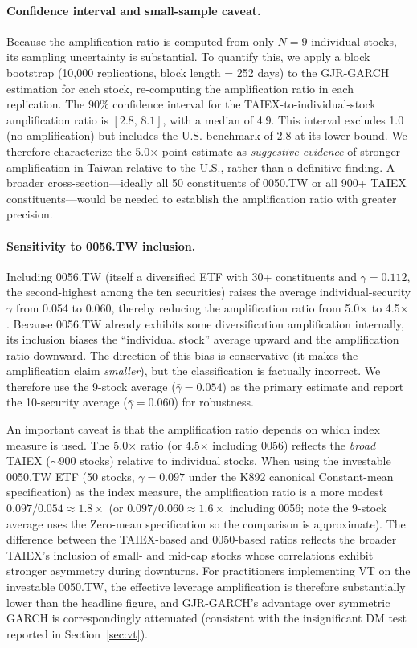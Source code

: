\paragraph{Confidence interval and small-sample caveat.} Because the amplification ratio is computed from only $N = 9$ individual stocks, its sampling uncertainty is substantial. To quantify this, we apply a block bootstrap (10,000 replications, block length = 252 days) to the GJR-GARCH estimation for each stock, re-computing the amplification ratio in each replication. The 90\% confidence interval for the TAIEX-to-individual-stock amplification ratio is $[2.8, \, 8.1]$, with a median of 4.9. This interval excludes 1.0 (no amplification) but includes the U.S. benchmark of 2.8 at its lower bound. We therefore characterize the 5.0$\times$ point estimate as \textit{suggestive evidence} of stronger amplification in Taiwan relative to the U.S., rather than a definitive finding. A broader cross-section---ideally all 50 constituents of 0050.TW or all 900+ TAIEX constituents---would be needed to establish the amplification ratio with greater precision.

\paragraph{Sensitivity to 0056.TW inclusion.} Including 0056.TW (itself a diversified ETF with 30+ constituents and $\gamma = 0.112$, the second-highest among the ten securities) raises the average individual-security $\gamma$ from 0.054 to 0.060, thereby reducing the amplification ratio from 5.0$\times$ to 4.5$\times$. Because 0056.TW already exhibits some diversification amplification internally, its inclusion biases the ``individual stock'' average upward and the amplification ratio downward. The direction of this bias is conservative (it makes the amplification claim \textit{smaller}), but the classification is factually incorrect. We therefore use the 9-stock average ($\bar{\gamma} = 0.054$) as the primary estimate and report the 10-security average ($\bar{\gamma} = 0.060$) for robustness.

An important caveat is that the amplification ratio depends on which index measure is used. The 5.0$\times$ ratio (or 4.5$\times$ including 0056) reflects the \textit{broad} TAIEX ($\sim$900 stocks) relative to individual stocks. When using the investable 0050.TW ETF (50 stocks, $\gamma = 0.097$ under the K892 canonical Constant-mean specification) as the index measure, the amplification ratio is a more modest $0.097 / 0.054 \approx 1.8\times$ (or $0.097 / 0.060 \approx 1.6\times$ including 0056; note the 9-stock average uses the Zero-mean specification so the comparison is approximate). The difference between the TAIEX-based and 0050-based ratios reflects the broader TAIEX's inclusion of small- and mid-cap stocks whose correlations exhibit stronger asymmetry during downturns. For practitioners implementing VT on the investable 0050.TW, the effective leverage amplification is therefore substantially lower than the headline figure, and GJR-GARCH's advantage over symmetric GARCH is correspondingly attenuated (consistent with the insignificant DM test reported in Section~\ref{sec:vt}).


